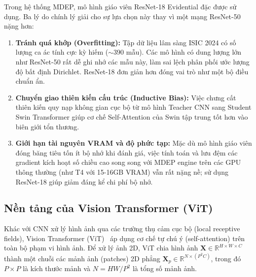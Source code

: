 \documentclass[11pt, a4paper]{article}
\begin{document}
Trong hệ thống MDEP, mô hình giáo viên ResNet-18 Evidential đặc được sử dụng. Ba lý do chính lý giải cho sự lựa chọn này thay vì một mạng ResNet-50 nặng hơn:
\begin{enumerate}[label=(\roman*)]
    \item \textbf{Tránh quá khớp (Overfitting):} Tập dữ liệu lâm sàng ISIC 2024 có số lượng ca ác tính cực kỳ hiếm (${\sim}390$ mẫu). Các mô hình có dung lượng lớn như ResNet-50 rất dễ ghi nhớ các mẫu này, làm sai lệch phân phối ước lượng độ bất định Dirichlet. ResNet-18 đơn giản hơn đóng vai trò như một bộ điều chuẩn ẩn.
    \item \textbf{Chuyển giao thiên kiến cấu trúc (Inductive Bias):} Việc chưng cất thiên kiến quy nạp không gian cục bộ từ mô hình Teacher CNN sang Student Swin Transformer giúp cơ chế Self-Attention của Swin tập trung tốt hơn vào biên giới tổn thương.
    \item \textbf{Giới hạn tài nguyên VRAM và độ phức tạp:} Mặc dù mô hình giáo viên đóng băng tiêu tốn ít bộ nhớ khi đánh giá, việc tính toán và lưu đệm các gradient kích hoạt số chiều cao song song với MDEP engine trên các GPU thông thường (như T4 với 15-16GB VRAM) vẫn rất nặng nề; sử dụng ResNet-18 giúp giảm đáng kể chi phí bộ nhớ.
\end{enumerate}

\subsection{Nền tảng của Vision Transformer (ViT)}

Khác với CNN xử lý hình ảnh qua các trường thụ cảm cục bộ (local receptive fields), Vision Transformer (ViT)~\cite{dosovitskiy2021image} áp dụng cơ chế tự chú ý (self-attention) trên toàn bộ phạm vi hình ảnh. Để xử lý ảnh 2D, ViT chia hình ảnh $\mathbf{X} \in \mathbb{R}^{H \times W \times C}$ thành một chuỗi các mảnh ảnh (patches) 2D phẳng $\mathbf{X}_p \in \mathbb{R}^{N \times (P^2 C)}$, trong đó $P \times P$ là kích thước mảnh và $N = HW/P^2$ là tổng số mảnh ảnh.
\end{document}
